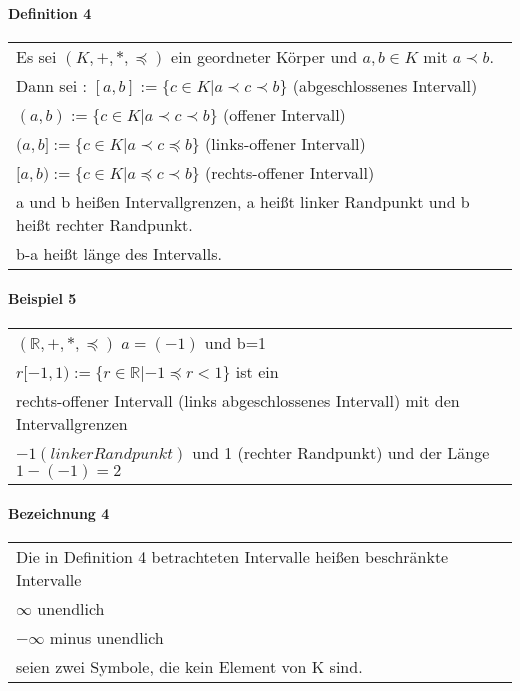 \documentclass[a4paper]{scrartcl}
\begin{document}
\paragraph{Definition 4}
\begin{tabbing}
\begin{tabular}{l}
Es sei $(K,+,*,\preceq)$ ein geordneter Körper und $a,b\in K$ mit $a\prec b$.\\
Dann sei :
$[a,b] := \{ c\in K| a\prec c\prec b\}$ (abgeschlossenes Intervall)\\
$(a,b) := \{ c\in K| a\prec c\prec b\}$ (offener Intervall)\\
$(a,b] := \{ c\in K| a\prec c\preceq b\}$ (links-offener Intervall)\\
$[a,b) := \{ c\in K| a\preceq c\prec b\}$ (rechts-offener Intervall)\\
a und b heißen Intervallgrenzen, a heißt linker Randpunkt und b heißt rechter Randpunkt.\\
b-a heißt länge des Intervalls.
\end{tabular}
\end{tabbing}

\paragraph{Beispiel 5}
\begin{tabbing}
\begin{tabular}{l}
$(\mathbb{R},+,*,\preceq)\; a=(-1)$ und b=1\\
$r[-1,1) := \{ r\in\mathbb{R} | -1\preceq r < 1\}$ ist ein \\
rechts-offener Intervall (links abgeschlossenes Intervall) mit den Intervallgrenzen\\
$-1 (linker Randpunkt)$ und 1 (rechter Randpunkt) und der Länge $1-(-1)=2$
\end{tabular}
\end{tabbing}

\paragraph{Bezeichnung 4}
\begin{tabbing}
\begin{tabular}{l}
Die in Definition 4 betrachteten Intervalle heißen beschränkte Intervalle\\
$\infty$ unendlich\\
$-\infty$ minus unendlich\\
seien zwei Symbole, die kein Element von K sind.
\end{tabular}
\end{tabbing}
\end{document}

